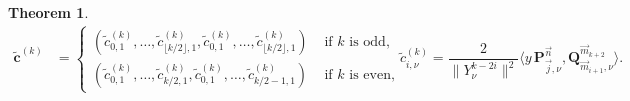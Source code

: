 \documentclass[10pt,a4paper]{amsart}
\newtheorem{theorem}{Theorem}
\begin{document}
\begin{theorem}
\begin{equation}
        \end{equation}
        \begin{equation}
        \label{eq:NNRR-coefficients-y}
        \begin{aligned}
            \tilde{\mathbf c}^{(k)} &=\begin{cases}
                (\tilde c^{(k)}_{0,1},\dots,\tilde c^{(k)}_{\lfloor k/2 \rfloor ,1}, \tilde c^{(k)}_{0,1}, \dots, \tilde c^{(k)}_{\lfloor k/2 \rfloor,1}) & \text{ if }k \text{ is odd},\\
                (\tilde c^{(k)}_{0,1},\dots,\tilde c^{(k)}_{k/2,1}, \tilde c^{(k)}_{0,1}, \dots, \tilde c^{(k)}_{k/2-1,1}) & \text{ if }k \text{ is even}, 
            \end{cases} &
            \tilde c^{(k)}_{i,\nu} = \dfrac{2}{\|Y_{\nu}^{k-2i}\|^2} \langle y\, \mathbf P_{\vec j,\nu}^{\vec n}, \mathbf Q^{\vec m_{k+2}}_{\vec m_{i+1},\nu}\rangle.
        \end{aligned}
        \end{equation}
        
    \end{theorem}
\end{document}
